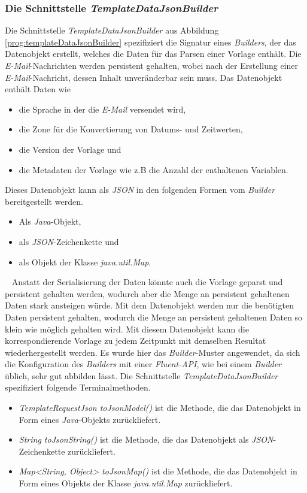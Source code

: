 \subsubsection{Die Schnittstelle \emph{TemplateDataJsonBuilder}}
\label{sec:templateDataJsonBuilder}
Die Schnittstelle \emph{TemplateDataJsonBuilder} aus Abbildung \ref{prog:templateDataJsonBuilder} spezifiziert die Signatur eines \emph{Builders}, der das Datenobjekt erstellt, welches die Daten für das Parsen einer Vorlage enthält. Die \emph{E-Mail}-Nachrichten werden persistent gehalten, wobei nach der Erstellung einer \emph{E-Mail}-Nachricht, dessen Inhalt unveränderbar sein muss. Das Datenobjekt enthält Daten wie
\begin{itemize}
	\item die Sprache in der die \emph{E-Mail} versendet wird,
	\item die Zone für die Konvertierung von Datums- und Zeitwerten,
	\item die Version der Vorlage und 
	\item die Metadaten der Vorlage wie z.B die Anzahl der enthaltenen Variablen.
\end{itemize} 
Dieses Datenobjekt kann als \emph{JSON} in den folgenden Formen vom \emph{Builder} bereitgestellt werden.
\begin{itemize}
	\item Als \emph{Java}-Objekt,
	\item als \emph{JSON}-Zeichenkette und
	\item als Objekt der Klasse \emph{java.util.Map}.
\end{itemize}
\ \newline
Anstatt der Serialisierung der Daten könnte auch die Vorlage geparst und persistent gehalten werden, wodurch aber die Menge an persistent gehaltenen Daten stark ansteigen würde. Mit dem Datenobjekt werden nur die benötigten Daten persistent gehalten, wodurch die Menge an persistent gehaltenen Daten so klein wie möglich gehalten wird. Mit diesem Datenobjekt kann die korrespondierende Vorlage zu jedem Zeitpunkt mit demselben Resultat wiederhergestellt werden.
\newline
\newline
Es wurde hier das \emph{Builder}-Muster angewendet, da sich die Konfiguration des \emph{Builders} mit einer \emph{Fluent-API}, wie bei einem \emph{Builder} üblich, sehr gut abbilden lässt. Die Schnittstelle \emph{TemplateDataJsonBuilder} spezifiziert folgende Terminalmethoden.
\begin{itemize}
	\item\emph{TemplateRequestJson toJsonModel()}
	\newline
	ist die Methode, die das Datenobjekt in Form eines \emph{Java}-Objekts zurückliefert.
	\item\emph{String toJsonString()}
	\newline
	ist die Methode, die das Datenobjekt als \emph{JSON}-Zeichenkette zurückliefert.
	\item\emph{Map<String, Object> toJsonMap()}
	\newline
	ist die Methode, die das Datenobjekt in Form eines Objekts der Klasse \emph{java.util.Map} zurückliefert.
\end{itemize} 
